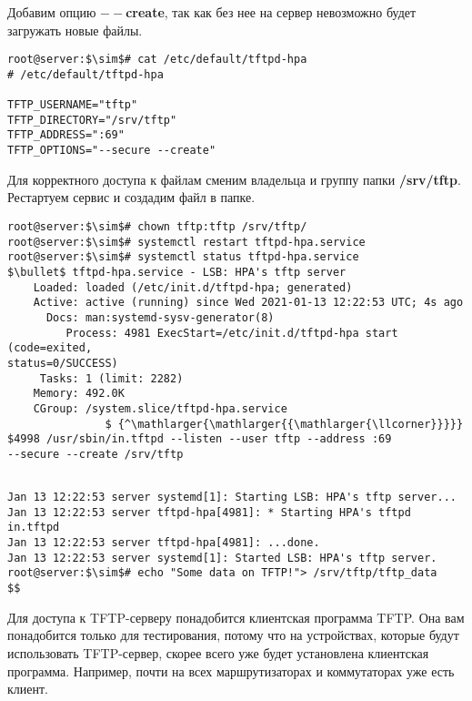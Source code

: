 \documentclass[14pt, a4paper]{article}
\begin{document}
Добавим опцию \textbf{$--$create}, так как без нее на сервер невозможно будет загружать новые файлы.

\vspace{0.3cm}
\begin{lstlisting}
root@server:$\sim$# cat /etc/default/tftpd-hpa
# /etc/default/tftpd-hpa

TFTP_USERNAME="tftp"
TFTP_DIRECTORY="/srv/tftp"
TFTP_ADDRESS=":69"
TFTP_OPTIONS="--secure --create"
\end{lstlisting}
\vspace{0.2cm}

Для корректного доступа к файлам сменим владельца и группу папки \textbf{/srv/tftp}. Рестартуем сервис и
создадим файл в папке.

\vspace{0.3cm}
\begin{lstlisting}
root@server:$\sim$# chown tftp:tftp /srv/tftp/
root@server:$\sim$# systemctl restart tftpd-hpa.service
root@server:$\sim$# systemctl status tftpd-hpa.service
$\bullet$ tftpd-hpa.service - LSB: HPA's tftp server
    Loaded: loaded (/etc/init.d/tftpd-hpa; generated)
    Active: active (running) since Wed 2021-01-13 12:22:53 UTC; 4s ago
      Docs: man:systemd-sysv-generator(8)
         Process: 4981 ExecStart=/etc/init.d/tftpd-hpa start (code=exited,
status=0/SUCCESS)
     Tasks: 1 (limit: 2282)
    Memory: 492.0K
    CGroup: /system.slice/tftpd-hpa.service
               $ {^\mathlarger{\mathlarger{{\mathlarger{\llcorner}}}}} $4998 /usr/sbin/in.tftpd --listen --user tftp --address :69
--secure --create /srv/tftp
\end{lstlisting}
\newpage

\begin{lstlisting}
    
Jan 13 12:22:53 server systemd[1]: Starting LSB: HPA's tftp server...
Jan 13 12:22:53 server tftpd-hpa[4981]: * Starting HPA's tftpd in.tftpd
Jan 13 12:22:53 server tftpd-hpa[4981]: ...done.
Jan 13 12:22:53 server systemd[1]: Started LSB: HPA's tftp server.
root@server:$\sim$# echo "Some data on TFTP!"> /srv/tftp/tftp_data
$$
\end{lstlisting}
\vspace{0.2cm}

Для доступа к TFTP-серверу понадобится клиентская программа TFTP. Она вам понадобится только
для тестирования, потому что на устройствах, которые будут использовать TFTP-сервер, скорее всего
уже будет установлена клиентская программа. Например, почти на всех маршрутизаторах и
коммутаторах уже есть клиент.
\end{document}
